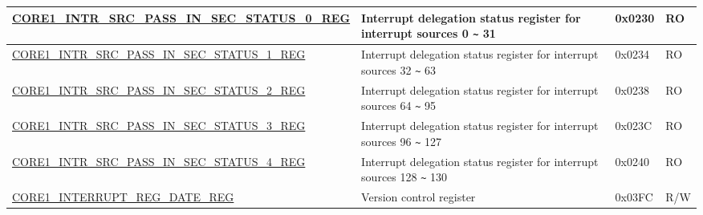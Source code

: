 \begin{longtable}{ | p{7.5cm} | p{7.2cm} | p{1.3cm} | p{1cm} | }
\hyperref[regdesc:CORE1INTRSRCPASSINSECSTATUS0REG]{CORE1\_INTR\_SRC\_PASS\_IN\_SEC\_STATUS\_0\_REG} & Interrupt delegation status register for interrupt sources 0 \verb+~+ 31 & 0x0230 & RO \\ \hline

\hyperref[regdesc:CORE1INTRSRCPASSINSECSTATUS1REG]{CORE1\_INTR\_SRC\_PASS\_IN\_SEC\_STATUS\_1\_REG} & Interrupt delegation status register for interrupt sources 32 \verb+~+ 63 & 0x0234 & RO \\ \hline

\hyperref[regdesc:CORE1INTRSRCPASSINSECSTATUS2REG]{CORE1\_INTR\_SRC\_PASS\_IN\_SEC\_STATUS\_2\_REG} & Interrupt delegation status register for interrupt sources 64 \verb+~+ 95 & 0x0238 & RO \\ \hline

\hyperref[regdesc:CORE1INTRSRCPASSINSECSTATUS3REG]{CORE1\_INTR\_SRC\_PASS\_IN\_SEC\_STATUS\_3\_REG} & Interrupt delegation status register for interrupt sources 96 \verb+~+ 127 & 0x023C & RO \\ \hline

\hyperref[regdesc:CORE1INTRSRCPASSINSECSTATUS4REG]{CORE1\_INTR\_SRC\_PASS\_IN\_SEC\_STATUS\_4\_REG} & Interrupt delegation status register for interrupt sources 128 \verb+~+ 130 & 0x0240 & RO \\ \hline


\hyperref[regdesc:CORE1INTERRUPTREGDATEREG]{CORE1\_INTERRUPT\_REG\_DATE\_REG} & Version control register & 0x03FC & R/W \\ \hline
\end{longtable}
